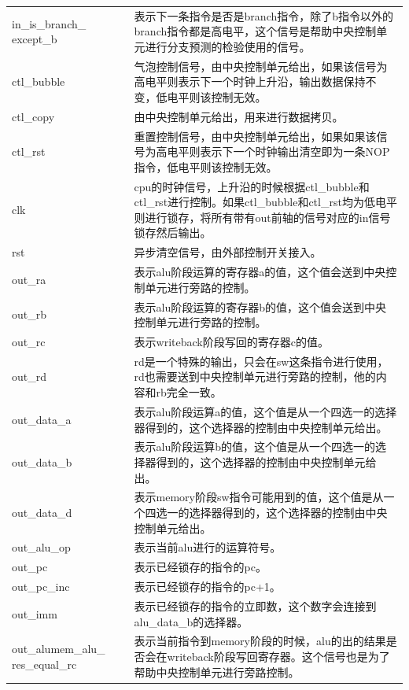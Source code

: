 \begin{center}
\begin{longtable}{p{}p{}}
        in\_is\_branch\_  except\_b & 表示下一条指令是否是branch指令，除了b指令以外的branch指令都是高电平，这个信号是帮助中央控制单元进行分支预测的检验使用的信号。 \\
        ctl\_bubble &  气泡控制信号，由中央控制单元给出，如果该信号为高电平则表示下一个时钟上升沿，输出数据保持不变，低电平则该控制无效。\\
        ctl\_copy &  由中央控制单元给出，用来进行数据拷贝。\\
        ctl\_rst &  重置控制信号，由中央控制单元给出，如果如果该信号为高电平则表示下一个时钟输出清空即为一条NOP指令，低电平则该控制无效。\\
        clk &  cpu的时钟信号，上升沿的时候根据ctl\_bubble和ctl\_rst进行控制。如果ctl\_bubble和ctl\_rst均为低电平则进行锁存，将所有带有out前轴的信号对应的in信号锁存然后输出。\\
        rst &  异步清空信号，由外部控制开关接入。\\
        out\_ra &  表示alu阶段运算的寄存器a的值，这个值会送到中央控制单元进行旁路的控制。\\
        out\_rb &  表示alu阶段运算的寄存器b的值，这个值会送到中央控制单元进行旁路的控制。\\
        out\_rc &  表示writeback阶段写回的寄存器c的值。\\
        out\_rd &  rd是一个特殊的输出，只会在sw这条指令进行使用，rd也需要送到中央控制单元进行旁路的控制，他的内容和rb完全一致。\\
        out\_data\_a &  表示alu阶段运算a的值，这个值是从一个四选一的选择器得到的，这个选择器的控制由中央控制单元给出。\\
        out\_data\_b &  表示alu阶段运算b的值，这个值是从一个四选一的选择器得到的，这个选择器的控制由中央控制单元给出。\\
        out\_data\_d &  表示memory阶段sw指令可能用到的值，这个值是从一个四选一的选择器得到的，这个选择器的控制由中央控制单元给出。\\
        out\_alu\_op &  表示当前alu进行的运算符号。\\
        out\_pc &  表示已经锁存的指令的pc。\\
        out\_pc\_inc &  表示已经锁存的指令的pc+1。\\
        out\_imm &  表示已经锁存的指令的立即数，这个数字会连接到alu\_data\_b的选择器。\\
        out\_alumem\_alu\_  res\_equal\_rc &  表示当前指令到memory阶段的时候，alu的出的结果是否会在writeback阶段写回寄存器。这个信号也是为了帮助中央控制单元进行旁路控制。\\

\end{longtable}
\end{center}
